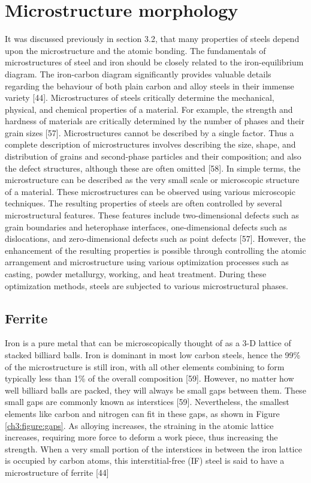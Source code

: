 \documentclass[12pt]{report}
\begin{document}
\section{Microstructure morphology} 
It was discussed previously in section 3.2, that many properties of steels depend upon the microstructure and the atomic bonding. The fundamentals of microstructures of steel and iron should be closely related to the iron-equilibrium diagram. The iron-carbon diagram significantly provides valuable details regarding the behaviour of both plain carbon and alloy steels in their immense variety [44]. 
Microstructures of steels critically determine the mechanical, physical, and chemical properties of a material. For example, the strength and hardness of materials are critically determined by the number of phases and their grain sizes [57]. Microstructures cannot be described by a single factor. Thus a complete description of microstructures involves describing the size, shape, and distribution of grains and second-phase particles and their composition; and also the defect structures, although these are often omitted [58]. In simple terms, the microstructure can be described as the very small scale or microscopic structure of a material. These microstructures can be observed using various microscopic techniques.  
The resulting properties of steels are often controlled by several microstructural features. These features include two-dimensional defects such as grain boundaries and heterophase interfaces, one-dimensional defects such as dislocations, and zero-dimensional defects such as point defects [57]. However, the enhancement of the resulting properties is possible through controlling the atomic arrangement and microstructure using various optimization processes such as casting, powder metallurgy, working, and heat treatment. During these optimization methods, steels are subjected to various microstructural phases.

\subsection{Ferrite} 
Iron is a pure metal that can be microscopically thought of as a 3-D lattice of stacked billiard balls. Iron is dominant in most low carbon steels, hence the 99\% of the microstructure is still iron, with all other elements combining to form typically less than 1\% of the overall composition [59]. However, no matter how well billiard balls are packed, they will always be small gaps between them. These small gaps are commonly known as interstices [59]. Nevertheless, the smallest elements like carbon and nitrogen can fit in these gaps, as shown in Figure \ref{ch3:figure:gaps}. As alloying increases, the straining in the atomic lattice increases, requiring more force to deform a work piece, thus increasing the strength. When a very small portion of the interstices in between the iron lattice is occupied by carbon atoms, this interstitial-free (IF) steel is said to have a microstructure of ferrite [44]
 
\end{document}
